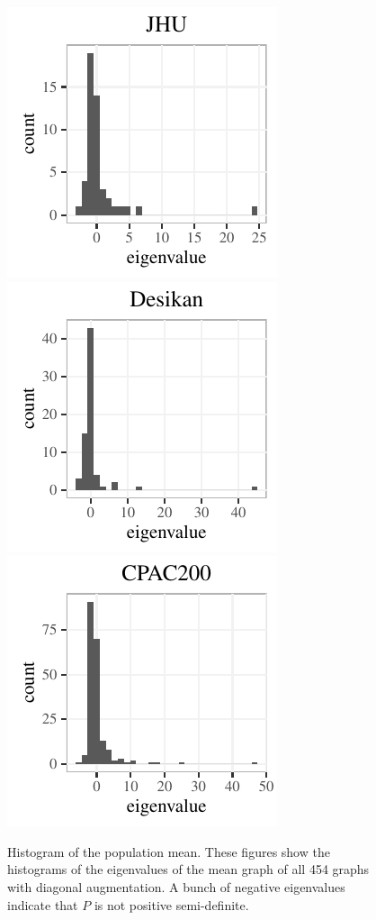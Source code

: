  \begin{figure}[!htbp]
 \centering
 \includegraphics[height=.2\textheight]{./Figures/hist_JHU.pdf} 
 \includegraphics[height=.2\textheight]{./Figures/hist_desikan.pdf} 
 \includegraphics[height=.2\textheight]{./Figures/hist_CPAC200.pdf}
 \caption[Histogram of the population mean]{Histogram of the population mean.
 These figures show the histograms of the eigenvalues of the mean graph of all 454 graphs with diagonal augmentation. A bunch of negative eigenvalues indicate that $P$ is not positive semi-definite.
 }
 \label{fig:LLG_histogram}
 \end{figure}


